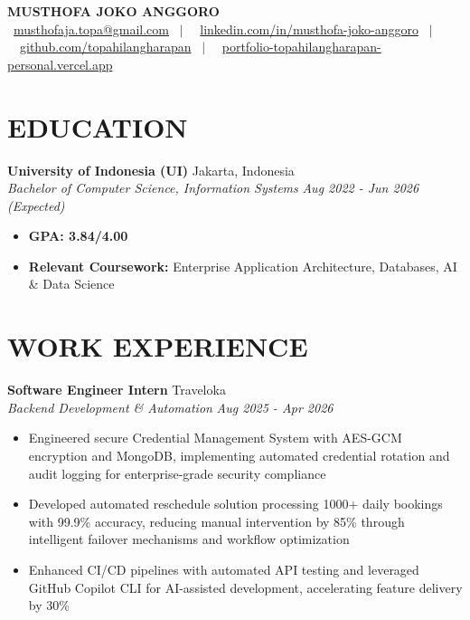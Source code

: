 \documentclass[10pt,a4paper]{article}
\newcommand{\contactline}[1]{\small #1}
\newcommand{\experienceheader}[4]{
    \textbf{#1} \hfill #2 \\
    \textit{#3} \hfill \textit{#4}
}
\begin{document}
\begin{center}
    {\LARGE \textbf{MUSTHOFA JOKO ANGGORO}} \\[2pt]
    \contactline{
        \faEnvelope\ \href{mailto:musthofaja.topa@gmail.com}{musthofaja.topa@gmail.com} \ $|$ \ 
        \faLinkedin\ \href{https://www.linkedin.com/in/musthofa-joko-anggoro/}{linkedin.com/in/musthofa-joko-anggoro} \ $|$ \
        \faGithub\ \href{https://github.com/topahilangharapan}{github.com/topahilangharapan} \ $|$ \
        \faGlobe\ \href{https://portfolio-topahilangharapan-personal.vercel.app/}{portfolio-topahilangharapan-personal.vercel.app}
    }
\end{center}

\vspace{-10pt}

\section*{EDUCATION}

\experienceheader{University of Indonesia (UI)}{Jakarta, Indonesia}{Bachelor of Computer Science, Information Systems}{Aug 2022 - Jun 2026 (Expected)}
\begin{itemize}[leftmargin=*, itemsep=1pt, topsep=1pt]
    \item \textbf{GPA: 3.84/4.00}
    \item \textbf{Relevant Coursework:} Enterprise Application Architecture, Databases, AI \& Data Science
\end{itemize}

\section*{WORK EXPERIENCE}

\experienceheader{Software Engineer Intern}{Traveloka}{Backend Development \& Automation}{Aug 2025 - Apr 2026}
\begin{itemize}[leftmargin=*, itemsep=1pt, topsep=1pt]
    \item Engineered secure Credential Management System with AES-GCM encryption and MongoDB, implementing automated credential rotation and audit logging for enterprise-grade security compliance
    \item Developed automated reschedule solution processing 1000+ daily bookings with 99.9\% accuracy, reducing manual intervention by 85\% through intelligent failover mechanisms and workflow optimization
    \item Enhanced CI/CD pipelines with automated API testing and leveraged GitHub Copilot CLI for AI-assisted development, accelerating feature delivery by 30\%
\end{itemize}
\end{document}
